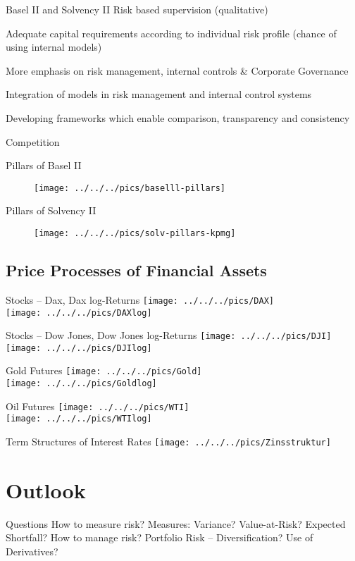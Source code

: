 Basel II and Solvency II
	Risk based supervision (qualitative)
	
	Adequate capital requirements according to individual risk profile (chance of using internal models)
	
	More emphasis on risk management, internal controls \& Corporate Governance
	
	Integration of models in risk management and internal control systems
	
	Developing frameworks which enable comparison, transparency and consistency
	
	Competition


Pillars of Basel II
\begin{figure}
	\centering
		\texttt{[image: ../../../pics/baselll-pillars]}
	\label{fig:Risk_map6}
\end{figure}


Pillars of Solvency II
\begin{figure}
	\centering
		\texttt{[image: ../../../pics/solv-pillars-kpmg]}
	\label{fig:Risk_map}
\end{figure}


\subsection{Price Processes of Financial Assets}

Stocks -- Dax, Dax log-Returns
\texttt{[image: ../../../pics/DAX]}\\
\texttt{[image: ../../../pics/DAXlog]}


Stocks -- Dow Jones, Dow Jones log-Returns
\texttt{[image: ../../../pics/DJI]}\\
\texttt{[image: ../../../pics/DJIlog]}


Gold Futures
\texttt{[image: ../../../pics/Gold]}\\
\texttt{[image: ../../../pics/Goldlog]}


Oil  Futures 
\texttt{[image: ../../../pics/WTI]}\\
\texttt{[image: ../../../pics/WTIlog]}


Term Structures of Interest Rates
\texttt{[image: ../../../pics/Zinsstruktur]}


\section{Outlook}
Questions
	How to measure risk? Measures: Variance? Value-at-Risk? Expected Shortfall?
	How to manage risk? Portfolio Risk -- Diversification? Use of Derivatives?